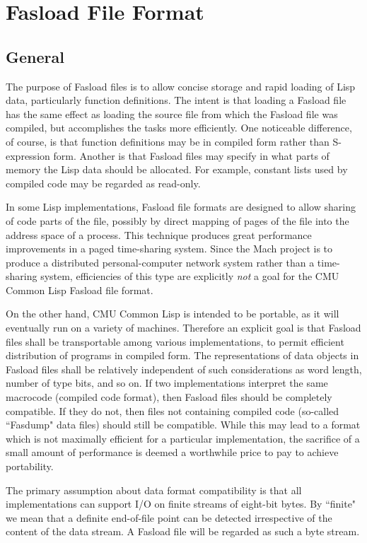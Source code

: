 \chapter{Fasload File Format}%
\section{General}

The purpose of Fasload files is to allow concise storage and rapid
loading of Lisp data, particularly function definitions.  The intent
is that loading a Fasload file has the same effect as loading the
source file from which the Fasload file was compiled, but accomplishes
the tasks more efficiently.  One noticeable difference, of course, is
that function definitions may be in compiled form rather than
S-expression form.  Another is that Fasload files may specify in what
parts of memory the Lisp data should be allocated.  For example,
constant lists used by compiled code may be regarded as read-only.

In some Lisp implementations, Fasload file formats are designed to
allow sharing of code parts of the file, possibly by direct mapping
of pages of the file into the address space of a process.  This
technique produces great performance improvements in a paged
time-sharing system.  Since the Mach project is to produce a
distributed personal-computer network system rather than a
time-sharing system, efficiencies of this type are explicitly {\it not}
a goal for the CMU Common Lisp Fasload file format.

On the other hand, CMU Common Lisp is intended to be portable, as it will
eventually run on a variety of machines.  Therefore an explicit goal
is that Fasload files shall be transportable among various
implementations, to permit efficient distribution of programs in
compiled form.  The representations of data objects in Fasload files
shall be relatively independent of such considerations as word
length, number of type bits, and so on.  If two implementations
interpret the same macrocode (compiled code format), then Fasload
files should be completely compatible.  If they do not, then files
not containing compiled code (so-called ``Fasdump" data files) should
still be compatible.  While this may lead to a format which is not
maximally efficient for a particular implementation, the sacrifice of
a small amount of performance is deemed a worthwhile price to pay to
achieve portability.

The primary assumption about data format compatibility is that all
implementations can support I/O on finite streams of eight-bit bytes.
By ``finite" we mean that a definite end-of-file point can be detected
irrespective of the content of the data stream.  A Fasload file will
be regarded as such a byte stream.

